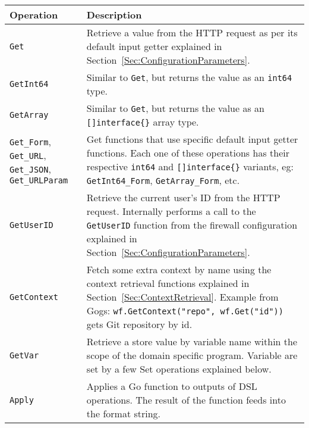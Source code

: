 \begin{table}[h]
\centering

\begin{tabular}{ m{2.5cm} m{11.5cm}  } 
 \hline
 Operation & Description \\ 
 \hline \hline

 \lstinline|Get| & Retrieve a value from the HTTP request as per its default input getter explained in Section~\ref{Sec:ConfigurationParameters}. \\ \hline

 \lstinline|GetInt64| & Similar to \lstinline|Get|, but returns the value as an \lstinline|int64| type. \\ \hline

 \lstinline|GetArray| & Similar to \lstinline|Get|, but returns the value as an \lstinline|[]interface{}| array type. \\ \hline

 \lstinline|Get_Form|, \lstinline|Get_URL|, \lstinline|Get_JSON|, \lstinline|Get_URLParam| & Get functions that use specific default input getter functions. Each one of these operations has their respective \lstinline|int64| and \lstinline|[]interface{}| variants, eg: \lstinline|GetInt64_Form|, \lstinline|GetArray_Form|, etc. \\ \hline

 \lstinline|GetUserID| & Retrieve the current user's ID from the HTTP request. Internally performs a call to the \lstinline|GetUserID| function from the firewall configuration explained in Section~\ref{Sec:ConfigurationParameters}. \\ \hline

 \lstinline|GetContext| & Fetch some extra context by name using the context retrieval functions explained in Section~\ref{Sec:ContextRetrieval}. \newline Example from Gogs: \lstinline|wf.GetContext("repo", wf.Get("id"))| gets Git repository by id. \\ \hline

 \lstinline|GetVar| & Retrieve a store value by variable name within the scope of the domain specific program. Variable are set by a few Set operations explained below. \\ \hline

 \lstinline|Apply| & Applies a Go function to outputs of DSL operations. The result of the function feeds into the format string. \\ \hline

\end{tabular}\label{Table:DSL_GetterOperations}
\end{table}

